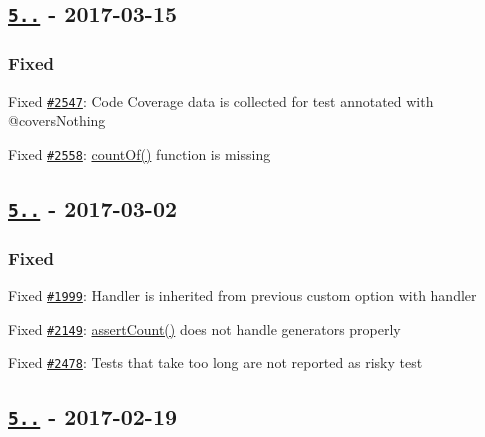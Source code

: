 \subsection*{\href{https://github.com/sebastianbergmann/phpunit/compare/5.7.15...5.7.16}{\tt 5..} -\/ 2017-\/03-\/15}

\subsubsection*{Fixed}


\begin{DoxyItemize}
\item Fixed \href{https://github.com/sebastianbergmann/phpunit/issues/2547}{\tt \#2547}\+: Code Coverage data is collected for test annotated with {\ttfamily @covers\+Nothing}
\item Fixed \href{https://github.com/sebastianbergmann/phpunit/issues/2558}{\tt \#2558}\+: {\ttfamily \mbox{\hyperlink{_functions_8php_ac2f7f290c0baf2e861e29a1359d1b613}{count\+Of()}}} function is missing
\end{DoxyItemize}

\subsection*{\href{https://github.com/sebastianbergmann/phpunit/compare/5.7.14...5.7.15}{\tt 5..} -\/ 2017-\/03-\/02}

\subsubsection*{Fixed}


\begin{DoxyItemize}
\item Fixed \href{https://github.com/sebastianbergmann/phpunit/issues/1999}{\tt \#1999}\+: Handler is inherited from previous custom option with handler
\item Fixed \href{https://github.com/sebastianbergmann/phpunit/issues/2149}{\tt \#2149}\+: {\ttfamily \mbox{\hyperlink{_functions_8php_af5e94843432a981837016d92afadb274}{assert\+Count()}}} does not handle generators properly
\item Fixed \href{https://github.com/sebastianbergmann/phpunit/issues/2478}{\tt \#2478}\+: Tests that take too long are not reported as risky test
\end{DoxyItemize}

\subsection*{\href{https://github.com/sebastianbergmann/phpunit/compare/5.7.13...5.7.14}{\tt 5..} -\/ 2017-\/02-\/19}

